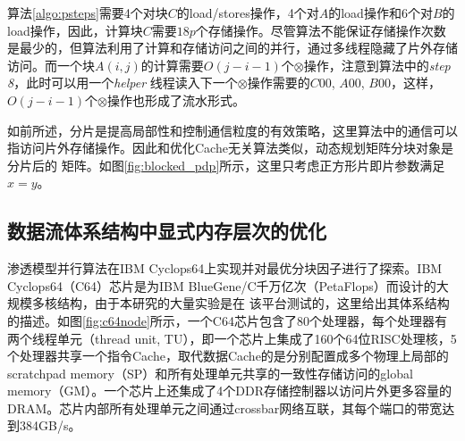 \begin{flushleft}
算法\ref{algo:psteps}需要4个对块$C$的load/stores操作，4个对$A$的load操作和6个对$B$的load操作，因此，计算块$C$需要$18p$个存储操作。尽管算法不能保证存储操作次数是最少的，但算法利用了计算和存储访问之间的并行，通过多线程隐藏了片外存储访问。而一个块$A(i,j)$的计算需要$O(j-i-1)$个$\otimes$操作，注意到算法中的{\em step 8}，此时可以用一个{\em helper}
线程读入下一个$\otimes$操作需要的$C00$, $A00$, $B00$，这样，$O(j-i-1)$个$\otimes$操作也形成了流水形式。

如前所述，分片是提高局部性和控制通信粒度的有效策略，这里算法中的通信可以指访问片外存储操作。因此和优化Cache无关算法类似，动态规划矩阵分块对象是分片后的
矩阵。如图\ref{fig:blocked_pdp}所示，这里只考虑正方形片即片参数满足$x=y$。


\subsection{数据流体系结构中显式内存层次的优化}
渗透模型并行算法在IBM Cyclops64上实现并对最优分块因子进行了探索。IBM Cyclops64（C64）芯片是为IBM BlueGene/C千万亿次（PetaFlops）而设计的大规模多核结构，由于本研究的大量实验是在
该平台测试的，这里给出其体系结构的描述。如图\ref{fig:c64node}所示，一个C64芯片包含了80个处理器，每个处理器有两个线程单元（thread unit, TU），即一个芯片上集成了160个64位RISC处理核，5个处理器共享一个指令Cache，取代数据Cache的是分别配置成多个物理上局部的scratchpad
memory（SP）和所有处理单元共享的一致性存储访问的global
memory（GM）。一个芯片上还集成了4个DDR存储控制器以访问片外更多容量的DRAM。芯片内部所有处理单元之间通过crossbar网络互联，其每个端口的带宽达到384GB/s。


\end{flushleft}
